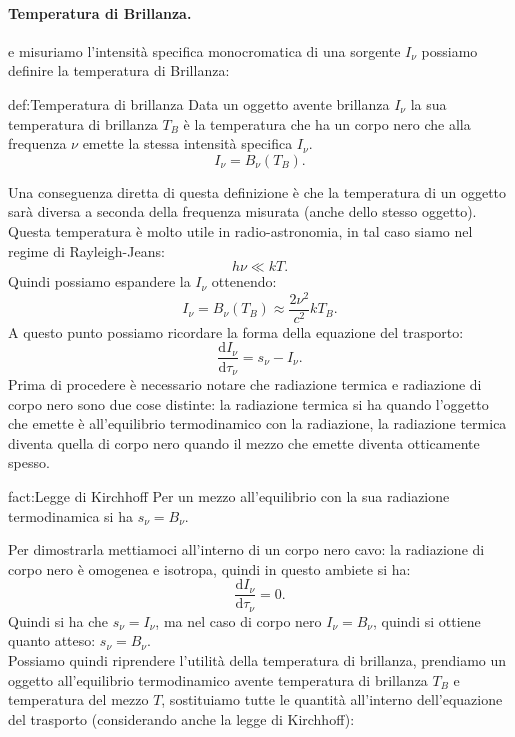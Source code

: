 \paragraph{Temperatura di Brillanza.}
e misuriamo l'intensità specifica monocromatica di una sorgente $I_{\nu} $ possiamo definire la temperatura di Brillanza:
\begin{defn}{def:Temperatura di brillanza}
	Data un oggetto avente brillanza $I_{\nu} $ la sua temperatura di brillanza $T_{B}$ è la temperatura che ha un corpo nero che alla frequenza $\nu $ emette la stessa intensità specifica $I_{\nu} $.
	\[
		I_{\nu} = B_{\nu} ( T_{B}) 
	.\] 
\end{defn}
Una conseguenza diretta di questa definizione è che la temperatura di un oggetto sarà diversa a seconda della frequenza misurata (anche dello stesso oggetto). \\
Questa temperatura è molto utile in radio-astronomia, in tal caso siamo nel regime di Rayleigh-Jeans:
\[
	h \nu  \ll kT
.\] 
Quindi possiamo espandere la $I_{\nu} $ ottenendo:
\[
	I_{\nu} = B_{\nu} ( T_{B}) \approx \frac{2\nu ^2}{c^2}kT_{B}
.\] 
A questo punto possiamo ricordare la forma della equazione del trasporto:
\[
	\frac{\mbox{d} I_{\nu} }{\mbox{d} \tau _{\nu} } = s_{\nu} -I_{\nu} 
.\] 
Prima di procedere è necessario notare che radiazione termica e radiazione di corpo nero sono due cose distinte: la radiazione termica si ha quando l'oggetto che emette è all'equilibrio termodinamico con la radiazione, la radiazione termica diventa quella di corpo nero quando il mezzo che emette diventa otticamente spesso.\\
\begin{fact}{fact:Legge di Kirchhoff}
	Per un mezzo all'equilibrio con la sua radiazione termodinamica si ha $s_{\nu} = B_{\nu} $.
\end{fact}
Per dimostrarla mettiamoci all'interno di un corpo nero cavo: la radiazione di corpo nero è omogenea e isotropa, quindi in questo ambiete si ha:
\[
	\frac{\mbox{d} I_{\nu} }{\mbox{d} \tau _{\nu} } = 0 
.\] 
Quindi si ha che $s_{\nu} = I_{\nu} $, ma nel caso di corpo nero $I_{\nu} = B_{\nu} $, quindi si ottiene quanto atteso: $s_{\nu} = B_{\nu} $.\\
Possiamo quindi riprendere l'utilità della temperatura di brillanza, prendiamo un oggetto all'equilibrio termodinamico avente temperatura di brillanza $T_{B}$ e temperatura del mezzo $T$, sostituiamo tutte le quantità all'interno dell'equazione del trasporto (considerando anche la legge di Kirchhoff):
